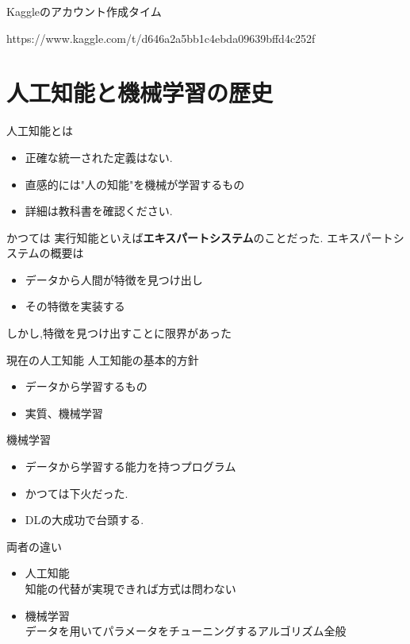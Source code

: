 Kaggleのアカウント作成タイム

https://www.kaggle.com/t/d646a2a5bb1c4ebda09639bffd4c252f

\section{人工知能と機械学習の歴史}

\begin{frame}{人工知能とは}
\begin{itemize}
\item 正確な統一された定義はない.
\item 直感的には"人の知能"を機械が学習するもの
\item 詳細は教科書を確認ください.
\end{itemize}
\end{frame}


\begin{frame}{かつては}
実行知能といえば\textbf{エキスパートシステム}のことだった.
エキスパートシステムの概要は
\begin{itemize}
  \item データから人間が特徴を見つけ出し
  \item その特徴を実装する
\end{itemize}
しかし,特徴を見つけ出すことに限界があった
\end{frame}


\begin{frame}{現在の人工知能}
人工知能の基本的方針
\begin{itemize}
\item データから学習するもの
\item 実質、機械学習
\end{itemize}
\end{frame}


\begin{frame}{機械学習}
\begin{itemize}
\item データから学習する能力を持つプログラム
\item かつては下火だった.
\item DLの大成功で台頭する.
\end{itemize}
\end{frame}


\begin{frame}{両者の違い}
\begin{itemize}
\item 人工知能 \\
      知能の代替が実現できれば方式は問わない
\item 機械学習
      \\ データを用いてパラメータをチューニングするアルゴリズム全般
\end{itemize}
\end{frame}


